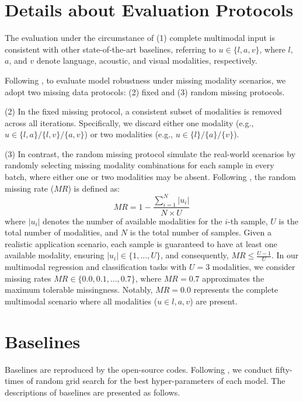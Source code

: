 \documentclass{article}
\begin{document}
\section{Details about Evaluation Protocols} \label{appendix_miss_protocol}
The evaluation under the circumstance of (1) complete multimodal input is consistent with other state-of-the-art baselines, referring to $u \in \{l,a,v\}$, where $l$, $a$, and $v$ denote language, acoustic, and visual modalities, respectively.

Following \cite{zhao2021missing,lian2023gcnet, wang2023incomplete,zhang2024towards}, to evaluate model robustness under missing modality scenarios, we adopt two missing data protocols: (2) fixed and (3) random missing protocols. 

(2) In the fixed missing protocol, a consistent subset of modalities is removed across all iterations. Specifically, we discard either one modality (e.g., $u \in \{l,a\}/\{l,v\}/\{a,v\}$) or two modalities (e.g., $u \in \{l\}/\{a\}/\{v\}$). 

(3) In contrast, the random missing protocol simulate the real-world scenarios by randomly selecting missing modality combinations for each sample in every batch, where either one or two modalities may be absent. Following \cite{lian2023gcnet,wang2023incomplete}, the random missing rate ($MR$) is defined as:
\begin{equation}
    MR=1-\frac{\sum^N_{i=1}|u_i|}{N\times U}
\end{equation}
where $|u_i|$ denotes the number of available modalities for the $i$-th sample, $U$ is the total number of modalities, and $N$ is the total number of samples. Given a realistic application scenario, each sample is guaranteed to have at least one available modality, ensuring $|u_i| \in \{1,...,U\}$, and consequently, $MR \leq \frac{U-1}{U}$. In our multimodal regression and classification tasks with $U=3$ modalities, we consider missing rates $MR \in \{0.0, 0.1, \dots, 0.7\}$, where $MR=0.7$ approximates the maximum tolerable missingness. Notably, $MR=0.0$ represents the complete multimodal scenario where all modalities ($u \in {l,a,v}$) are present.
 
\section{Baselines} \label{appendix_baseline}
Baselines are reproduced by the open-source codes. Following \cite{gkoumas2021makes}, we conduct fifty-times of random grid search for the best hyper-parameters of each model. The descriptions of baselines are presented as follows.
\end{document}
